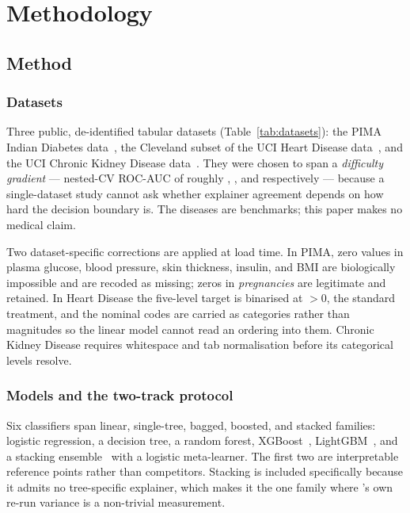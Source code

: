 \chapter{Methodology}\label{ch:method}

\section{Method}\label{sec:method}

\subsection{Datasets}\label{sec:method-data}
Three public, de-identified tabular datasets (Table~\ref{tab:datasets}): the PIMA
Indian Diabetes data~\cite{smith1988using}, the Cleveland subset of the UCI Heart
Disease data~\cite{detrano1989international}, and the UCI Chronic Kidney Disease
data~\cite{rubini2015ckd}. They were chosen to span a \emph{difficulty gradient} ---
nested-CV ROC-AUC of roughly \AucPima{}, \AucHeart{}, and \AucCkd{} respectively ---
because a single-dataset study cannot ask whether explainer agreement depends on how
hard the decision boundary is. The diseases are benchmarks; this paper makes no
medical claim.

Two dataset-specific corrections are applied at load time. In PIMA, zero values in
plasma glucose, blood pressure, skin thickness, insulin, and BMI are biologically
impossible and are recoded as missing; zeros in \emph{pregnancies} are legitimate and
retained. In Heart Disease the five-level target is binarised at $>0$, the standard
treatment, and the nominal codes are carried as categories rather than magnitudes so
the linear model cannot read an ordering into them. Chronic Kidney Disease requires
whitespace and tab normalisation before its categorical levels resolve.



\subsection{Models and the two-track protocol}\label{sec:method-protocol}
Six classifiers span linear, single-tree, bagged, boosted, and stacked families:
logistic regression, a decision tree, a random forest, XGBoost~\cite{chen2016xgboost},
LightGBM~\cite{ke2017lightgbm}, and a stacking ensemble~\cite{wolpert1992stacked} with
a logistic meta-learner. The first two are interpretable reference points rather than
competitors. Stacking is included specifically because it admits no tree-specific
explainer, which makes it the one family where \shap{}'s own re-run variance is a
non-trivial measurement.

